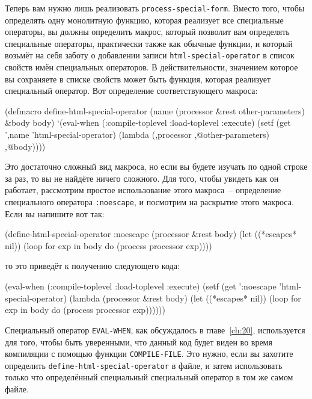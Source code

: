 Теперь вам нужно лишь реализовать \lstinline{process-special-form}.  Вместо того, чтобы
определять одну монолитную функцию, которая реализует все специальные операторы, вы должны
определить макрос, который позволит вам определять специальные операторы, практически
также как обычные функции, и который возьмёт на себя заботу о добавлении записи
\lstinline{html-special-operator} в список свойств имён специальных операторов.  В
действительности, значением которое вы сохраняете в списке свойств может быть функция,
которая реализует специальный оператор.  Вот определение соответствующего макроса:

\begin{myverb}
(defmacro define-html-special-operator (name (processor &rest other-parameters) &body body)
  `(eval-when (:compile-toplevel :load-toplevel :execute)
     (setf (get ',name 'html-special-operator)
           (lambda (,processor ,@other-parameters) ,@body))))
\end{myverb}

Это достаточно сложный вид макроса, но если вы будете изучать по одной строке за раз, то
вы не найдёте ничего сложного.  Для того, чтобы увидеть как он работает, рассмотрим
простое использование этого макроса~-- определение специального оператора
\lstinline{:noescape}, и посмотрим на раскрытие этого макроса.  Если вы напишите вот так:

\begin{myverb}
(define-html-special-operator :noescape (processor &rest body)
  (let ((*escapes* nil))
    (loop for exp in body do (process processor exp))))
\end{myverb}

то это приведёт к получению следующего кода:

\begin{myverb}
(eval-when (:compile-toplevel :load-toplevel :execute)
  (setf (get ':noescape 'html-special-operator)
        (lambda (processor &rest body)
          (let ((*escapes* nil))
            (loop for exp in body do (process processor exp))))))
\end{myverb}

Специальный оператор \lstinline{EVAL-WHEN}, как обсуждалось в главе~\ref{ch:20}, используется
для того, чтобы быть уверенными, что данный код будет виден во время компиляции с помощью
функции \lstinline{COMPILE-FILE}.  Это нужно, если вы захотите определить
\lstinline{define-html-special-operator} в файле, и затем использовать только что определённый
специальный специальный оператор в том же самом файле.

